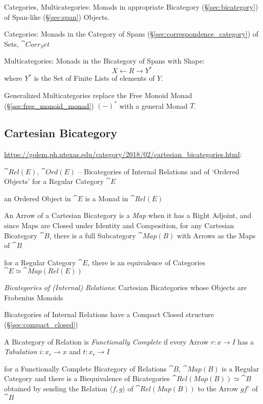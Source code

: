 Categories, Multicategories: Monads in appropriate Bicategory
(\S\ref{sec:bicategory}) of Span-like (\S\ref{sec:span}) Objects.

Categories: Monads in the Category of Spans
(\S\ref{sec:correspondence_category}) of Sets, $\cat{Corr_Set}$

Multicategories: Monads in the Bicategory of Spans with Shape:
\[
  X \leftarrow R \rightarrow Y^*
\]
where $Y^*$ is the Set of Finite Lists of elements of $Y$.

Generalized Multicategories replace the Free Monoid Monad
(\S\ref{sec:free_monoid_monad}) $(-)^*$ with a general Monad $T$.



\subsection{Cartesian Bicategory}\label{sec:cartesian_bicategory}

\url{https://golem.ph.utexas.edu/category/2018/02/cartesian_bicategories.html}:

$\cat{Rel(E)}$, $\cat{Ord(E)}$ -- Bicategories of Internal Relations and of
`Ordered Objects' for a Regular Category $\cat{E}$

an Ordered Object in $\cat{E}$ is a Monad in $\cat{Rel(E)}$

An Arrow of a Cartesian Bicategory is a \emph{Map} when it has a Right Adjoint,
and since Maps are Closed under Identity and Composition, for any Cartesian
Bicategory $\cat{B}$, there is a full Subcategory $\cat{Map(B)}$ with Arrows as
the Maps of $\cat{B}$

for a Regular Category $\cat{E}$, there is an equivalence of Categories
$\cat{E} \simeq \cat{Map(Rel(E))}$

\emph{Bicategories of (Internal) Relations}: Cartesian Bicategories whose
Objects are Frobenius Monoids

Bicategories of Internal Relations have a Compact Closed structure
(\S\ref{sec:compact_closed})

A Bicategory of Relation is \emph{Functionally Complete} if every Arrow $r : x
\rightarrow I$ has a \emph{Tabulation} $i : x_r \rightarrow x$ and $t : x_r
\rightarrow I$

for a Functionally Complete Bicategory of Relations $\cat{B}$, $\cat{Map(B)}$
is a Regular Category and there is a Biequivalence of Bicategories
$\cat{Rel(Map(B))} \simeq \cat{B}$ obtained by sending the Relation
$\langle{f,g}\rangle$ of $\cat{Rel(Map(B))}$ to the Arrow $gf^\circ$ of
$\cat{B}$



